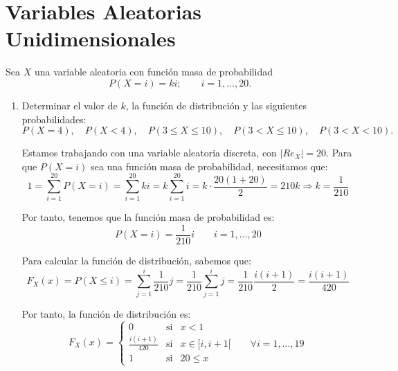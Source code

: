 \section{Variables Aleatorias Unidimensionales}


\begin{ejercicio}
    Sea $X$ una variable aleatoria con función masa de probabilidad $$P(X = i) = ki; \qquad i = 1, \dots , 20.$$
    \begin{enumerate}
        \item Determinar el valor de $k$, la función de distribución y las siguientes probabilidades:
        \begin{equation*}
            P(X = 4),\quad P(X <4),\quad  P(3 \leq X \leq 10),\quad  P(3 < X \leq 10),\quad  P(3 < X < 10).
        \end{equation*}

        Estamos trabajando con una variable aleatoria discreta, con $|Re_X|=20$. Para que $P(X=i)$ sea una función masa de probabilidad, necesitamos que:
        \begin{equation*}
            1 = \sum_{i=1}^{20} P(X=i)
            = \sum_{i=1}^{20} ki
            = k\sum_{i=1}^{20} i
            = k\cdot \frac{20(1+20)}{2} = 210k\Longrightarrow k=\frac{1}{210}
        \end{equation*}

        Por tanto, tenemos que la función masa de probabilidad es:
        \begin{equation*}
            P(X=i)=\frac{1}{210}i \qquad i=1,\dots,20
        \end{equation*}

        Para calcular la función de distribución, sabemos que:
        \begin{equation*}
            F_X(x)=P(X\leq i)=\sum_{j=1}^i \frac{1}{210}j
            =\frac{1}{210} \sum_{j=1}^i j
            = \frac{1}{210} \frac{i(i+1)}{2} = \frac{i(i+1)}{420}
        \end{equation*}

        Por tanto, la función de distribución es:
        \begin{equation*}
            F_X(x)=\left\{\begin{array}{lll}
                0 & \text{si} & x < 1\\
                \displaystyle \frac{i(i+1)}{420} & \text{si} & x\in [i, i+1[ \qquad \forall i=1,\dots,19 \\
                1 & \text{si} & 20\leq x
            \end{array}\right.
        \end{equation*}


\end{enumerate}
\end{ejercicio}
